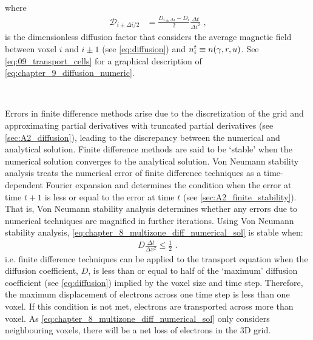 \noindent where
\begin{equation}
    \begin{aligned}
        \mathcal{D}_{i\pm\Delta i/2}&=\frac{D_{i\pm\Delta i}-D_i}{2} \frac{\Delta t}{\Delta i^2}\text{ ,} 
    \end{aligned} \label{eq:chapter_9_diffusion_numeric}
\end{equation}
\noindent is the dimensionless diffusion factor that considers the average magnetic field between voxel $i$ and $i\pm 1$ (see \autoref{eq:diffusion}) and $n_i^t\equiv n\qty(\gamma,r,u)$. See \autoref{eq:09_transport_cells} for a graphical description of \autoref{eq:chapter_9_diffusion_numeric}. 
\par~\par 
Errors in finite difference methods arise due to the discretization of the grid and approximating partial derivatives with truncated partial derivatives (see \autoref{sec:A2_diffusion}), leading to the discrepancy between the numerical and analytical solution. Finite difference methods are said to be `stable' when the numerical solution converges to the analytical solution. Von Neumann stability analysis treats the numerical error of finite difference techniques as a time-dependent Fourier expansion and determines the condition when the error at time $t+1$ is less or equal to the error at time $t$ (see \autoref{sec:A2_finite_stability}). That is, Von Neumann stability analysis determines whether any errors due to numerical techniques are magnified in further iterations. Using Von Neumann stability analysis, \autoref{eq:chapter_8_multizone_diff_numerical_sol} is stable when:
\begin{equation}
    \begin{aligned}
    D\frac{\Delta t}{\Delta x^2}\leq \frac{1}{2}\text{ .} 
    \end{aligned} \label{eq:09_finite_difference_diff_stable}
\end{equation}
\noindent i.e. finite difference techniques can be applied to the transport equation when the diffusion coefficient, $D$, is less than or equal to half of the `maximum' diffusion coefficient (see \autoref{eq:diffusion}) implied by the voxel size and time step. Therefore, the maximum displacement of electrons across one time step is less than one voxel. If this condition is not met, electrons are transported across more than voxel. As \autoref{eq:chapter_8_multizone_diff_numerical_sol} only considers neighbouring voxels, there will be a net loss of electrons in the 3D grid.

